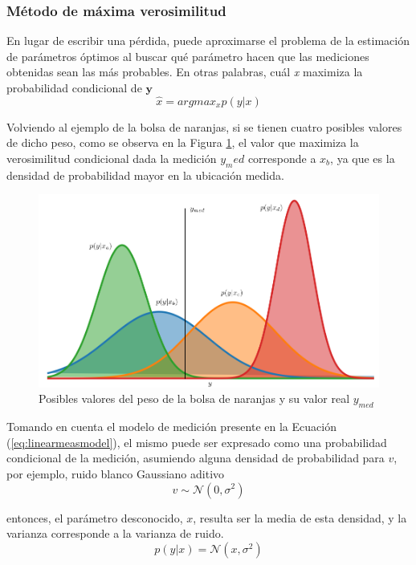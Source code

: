 \subsubsection{Método de máxima verosimilitud}

En lugar de escribir una pérdida, puede aproximarse el problema de la estimación de parámetros óptimos al buscar qué parámetro hacen que las mediciones obtenidas sean las más probables. En otras palabras, cuál \textit{x} maximiza la probabilidad condicional de $\bm{y}$
\begin{equation}
    \hat{x} = argmax_x p(y|x)
\end{equation}

Volviendo al ejemplo de la bolsa de naranjas, si se tienen cuatro posibles valores de dicho peso, como se observa en la Figura \ref{fig:mostlikelyproba}, el valor que maximiza la verosimilitud condicional dada la medición $y_med$ corresponde a $x_b$, ya que es la densidad de probabilidad mayor en la ubicación medida.
\begin{figure}
    \centering
    \includegraphics[width=\textwidth]{Img/MostLikelyProba.png}
    \caption{Posibles valores del peso de la bolsa de naranjas y su valor real $y_{med}$}
    \label{fig:mostlikelyproba}
\end{figure}

Tomando en cuenta el modelo de medición presente en la Ecuación (\ref{eq:linearmeasmodel}), el mismo puede ser expresado como una probabilidad condicional de la medición, asumiendo alguna densidad de probabilidad para $v$, por ejemplo, ruido blanco Gaussiano aditivo
\begin{equation}
    v \sim \mathcal{N}(0,\sigma^2)
\end{equation}

entonces, el parámetro desconocido, $x$, resulta ser la media de esta densidad, y la varianza corresponde a la varianza de ruido.
\begin{equation}
    p(y|x) = \mathcal{N}(x,\sigma^2)
\end{equation}

